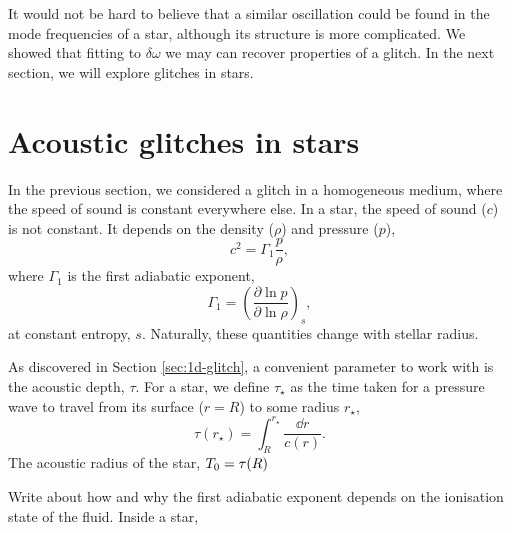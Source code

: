 It would not be hard to believe that a similar oscillation could be found in the mode frequencies of a star, although its structure is more complicated. We showed that fitting to \(\delta\omega\) we may can recover properties of a glitch. In the next section, we will explore glitches in stars.



\section{Acoustic glitches in stars}

In the previous section, we considered a glitch in a homogeneous medium, where the speed of sound is constant everywhere else. In a star, the speed of sound (\(c\)) is not constant. It depends on the density (\(\rho\)) and pressure (\(p\)),
%
\begin{equation}
    c^2 = \Gamma_1 \frac{p}{\rho},
\end{equation}
%
where \(\Gamma_1\) is the first adiabatic exponent,
%
\begin{equation}
    \Gamma_1 = \left( \frac{\partial \ln p}{\partial \ln \rho} \right)_s,
\end{equation}
%
at constant entropy, \(s\).  Naturally, these quantities change with stellar radius.

As discovered in Section \ref{sec:1d-glitch}, a convenient parameter to work with is the acoustic depth, \(\tau\). For a star, we define \(\tau_\star\) as the time taken for a pressure wave to travel from its surface (\(r=R\)) to some radius \(r_\star\),
%
\begin{equation}
    \tau(r_\star) = \int_R^{r_\star} \frac{\dd r}{c(r)}.
\end{equation}
%
The acoustic radius of the star, \({T_0} = \tau(R)\)

Write about how and why the first adiabatic exponent depends on the ionisation state of the fluid. Inside a star, 

